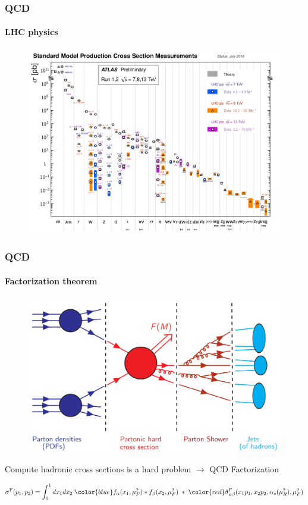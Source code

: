 \documentclass[aspectratio=43]{beamer}
\begin{document}
\begin{frame}

	\frametitle{QCD}
	\framesubtitle{LHC physics}
	
	\begin{figure}
		\includegraphics[width = 9.5 cm]{plots/section1/lhc_measurements.png}
	\end{figure}

\end{frame}

\begin{frame}

	\frametitle{QCD}
	\framesubtitle{Factorization theorem}

	\vspace{0.4 cm}
	
	\begin{figure}
		\includegraphics[width = 7 cm]{plots/section1/factorization_1.png}
	\end{figure}
	
	Compute hadronic cross sections is a {\color{red}hard problem} $\longrightarrow$ {\color{blue} QCD Factorization}
	
	\begin{equation}
		\sigma^{\textrm{F}}(p_{1}, p_{2}) =
		\int_{0}^{1} dx_{1} dx_{2} \; {\color{blue} f_{\alpha}(x_{1}, \mu_{F}^{2}) \ast f_{\beta}(x_{2}, \mu_{F}^{2})}
		\; \ast \;  
		{\color{red}\hat{\sigma}^{\textrm{F}}_{\alpha \beta}(x_{1}p_{1}, x_{2}p_{2}, \alpha_{s}(\mu_{R}^{2}), \mu_{F}^{2})} \nonumber
	\end{equation}

\end{frame}
\end{document}
